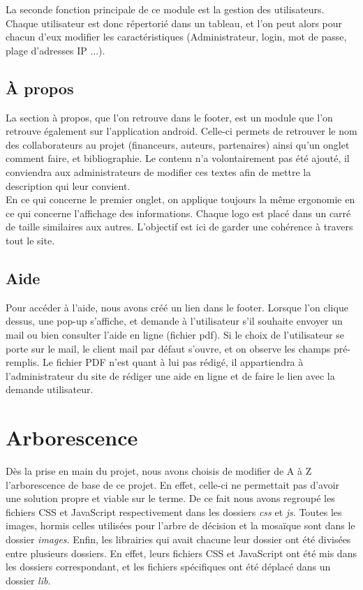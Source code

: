 \documentclass[twoside]{EPURapport}
\begin{document}
	La seconde fonction principale de ce module est la gestion des utilisateurs. Chaque utilisateur est donc répertorié dans un tableau, et l'on peut alors pour chacun d'eux modifier les caractéristiques (Administrateur, login, mot de passe, plage d'adresses IP ...).
		
		\subsection{À propos}
		
	La section à propos, que l'on retrouve dans le footer, est un module que l'on retrouve également sur l'application android. Celle-ci permets de retrouver le nom des collaborateurs au projet (financeurs, auteurs, partenaires) ainsi qu'un onglet comment faire, et bibliographie. Le contenu n'a volontairement pas été ajouté, il conviendra aux administrateurs de modifier ces textes afin de mettre la description qui leur convient.\\
	
	En ce qui concerne le premier onglet, on applique toujours la même ergonomie en ce qui concerne l'affichage des informations. Chaque logo est placé dans un carré de taille similaires aux autres. L'objectif est ici de garder une cohérence à travers tout le site.	
	
	\subsection{Aide}
		
		Pour accéder à l'aide, nous avons créé un lien dans le footer. Lorsque l'on clique dessus, une pop-up s'affiche, et demande à l'utilisateur s'il souhaite envoyer un mail ou bien consulter l'aide en ligne (fichier pdf). Si le choix de l'utilisateur se porte sur le mail, le client mail par défaut s'ouvre, et on observe les champs pré-remplis. Le fichier PDF n'est quant à lui pas rédigé, il appartiendra à l'administrateur du site de rédiger une aide en ligne et de faire le lien avec la demande utilisateur.
		

	\section{Arborescence}
	
	Dès la prise en main du projet, nous avons choisis de modifier de A à Z l'arborescence de base de ce projet. En effet, celle-ci ne permettait pas d'avoir une solution propre et viable sur le terme. De ce fait nous avons regroupé les fichiers CSS et JavaScript respectivement dans les dossiers \emph{css} et \emph{js}. Toutes les images, hormis celles utilisées pour l'arbre de décision et la mosaïque sont dans le dossier \emph{images}. Enfin, les librairies qui avait chacune leur dossier ont été divisées entre plusieurs dossiers. En effet, leurs fichiers CSS et JavaScript ont été mis dans les dossiers correspondant, et les fichiers spécifiques ont été déplacé dans un dossier \emph{lib}.\\
\end{document}
